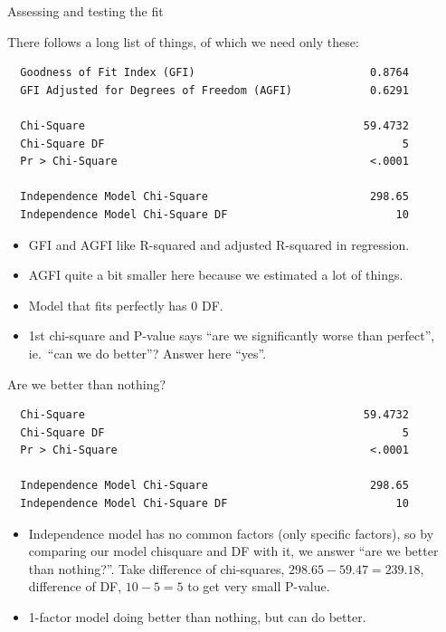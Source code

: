 \documentclass[pdf]{prosper}
\begin{document}
  \begin{slide}{Assessing and testing the fit}

There follows a long list of things, of which we need only these:

{\scriptsize
\begin{verbatim}
  Goodness of Fit Index (GFI)                           0.8764
  GFI Adjusted for Degrees of Freedom (AGFI)            0.6291

  Chi-Square                                           59.4732
  Chi-Square DF                                              5
  Pr > Chi-Square                                       <.0001

  Independence Model Chi-Square                         298.65
  Independence Model Chi-Square DF                          10

\end{verbatim}
}
\begin{itemize}
\item GFI and AGFI like R-squared and adjusted R-squared in regression.
\item AGFI quite a bit smaller here because we estimated a lot of things.
\item Model that fits perfectly has 0 DF.
\item 1st chi-square and P-value says ``are we significantly worse than perfect'', ie.\ ``can we do better''? Answer here ``yes''.
\end{itemize}

\end{slide}

\begin{slide}{Are we better than nothing?}

{\scriptsize
\begin{verbatim}
  Chi-Square                                           59.4732
  Chi-Square DF                                              5
  Pr > Chi-Square                                       <.0001

  Independence Model Chi-Square                         298.65
  Independence Model Chi-Square DF                          10

\end{verbatim}
}


\begin{itemize}

\item Independence model has no common factors (only specific factors), so by comparing our model chisquare and DF with it, we answer ``are we better than nothing?''. Take difference of chi-squares, $298.65-59.47=239.18$, difference of DF, $10-5=5$ to get very small P-value.
\item 1-factor model doing better than nothing, but can do better.
\end{itemize}
  \end{slide}
\end{document}

